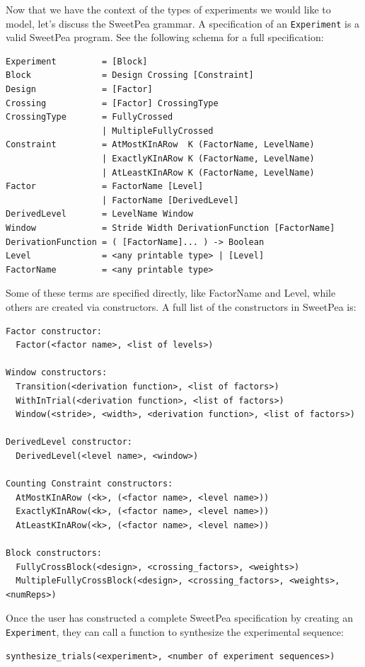 Now that we have the context of the types of experiments we would like to model, let's discuss the SweetPea grammar. A specification of an \texttt{Experiment} is a valid SweetPea program. See the following schema for a full specification:

\begin{verbatim}
Experiment         = [Block]
Block              = Design Crossing [Constraint]
Design             = [Factor]
Crossing           = [Factor] CrossingType
CrossingType       = FullyCrossed
                   | MultipleFullyCrossed
Constraint         = AtMostKInARow  K (FactorName, LevelName)
                   | ExactlyKInARow K (FactorName, LevelName)
                   | AtLeastKInARow K (FactorName, LevelName)
Factor             = FactorName [Level]
                   | FactorName [DerivedLevel]
DerivedLevel       = LevelName Window
Window             = Stride Width DerivationFunction [FactorName]
DerivationFunction = ( [FactorName]... ) -> Boolean
Level              = <any printable type> | [Level]
FactorName         = <any printable type>
\end{verbatim}

Some of these terms are specified directly, like FactorName and Level, while others are created via constructors. A full list of the constructors in SweetPea is:

\begin{verbatim}
Factor constructor:
  Factor(<factor name>, <list of levels>)

Window constructors:
  Transition(<derivation function>, <list of factors>)
  WithInTrial(<derivation function>, <list of factors>)
  Window(<stride>, <width>, <derivation function>, <list of factors>)

DerivedLevel constructor:
  DerivedLevel(<level name>, <window>)

Counting Constraint constructors:
  AtMostKInARow (<k>, (<factor name>, <level name>))
  ExactlyKInARow(<k>, (<factor name>, <level name>))
  AtLeastKInARow(<k>, (<factor name>, <level name>))
  
Block constructors:
  FullyCrossBlock(<design>, <crossing_factors>, <weights>)
  MultipleFullyCrossBlock(<design>, <crossing_factors>, <weights>, <numReps>)
\end{verbatim}

Once the user has constructed a complete SweetPea specification by creating an \texttt{Experiment}, they can call a function to synthesize the experimental sequence:

\begin{verbatim}
synthesize_trials(<experiment>, <number of experiment sequences>)
\end{verbatim}

